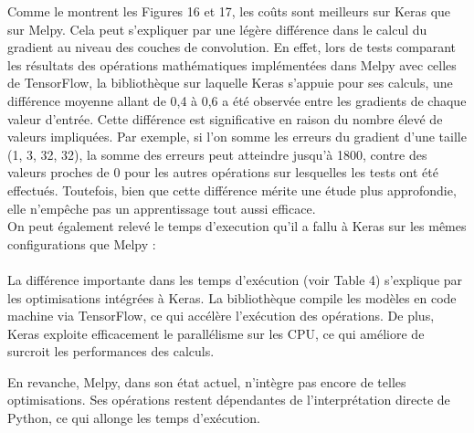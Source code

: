 \begin{multicols}{2}
Comme le montrent les Figures 16 et 17, les coûts sont meilleurs sur Keras que sur Melpy. Cela peut s’expliquer par une légère différence 
dans le calcul du gradient au niveau des couches de convolution. En effet, lors de tests comparant les résultats des opérations 
mathématiques implémentées dans Melpy avec celles de TensorFlow, la bibliothèque sur laquelle Keras s’appuie pour ses calculs, 
une différence moyenne allant de 0,4 à 0,6 a été observée entre les gradients de chaque valeur d’entrée. Cette différence est 
significative en raison du nombre élevé de valeurs impliquées. Par exemple, si l’on somme les erreurs du gradient d’une taille (1, 3, 32, 32), 
la somme des erreurs peut atteindre jusqu’à 1800, contre des valeurs proches de 0 pour les autres opérations sur lesquelles les tests ont été effectués. 
Toutefois, bien que cette différence mérite une étude plus approfondie, elle n’empêche pas un apprentissage tout aussi efficace. \\

On peut également relevé le temps d'execution qu'il a fallu à Keras sur les mêmes configurations que Melpy : \\

 \\

La différence importante dans les temps d’exécution (voir Table 4) s’explique par les optimisations intégrées à Keras. 
La bibliothèque compile les modèles en code machine via TensorFlow, ce qui accélère l’exécution 
des opérations. De plus, Keras exploite efficacement le parallélisme sur les CPU, 
ce qui améliore de surcroit les performances des calculs.

En revanche, Melpy, dans son état actuel, n’intègre pas encore de telles optimisations. 
Ses opérations restent dépendantes de l’interprétation directe de Python, ce qui allonge 
les temps d’exécution. \\

\end{multicols}